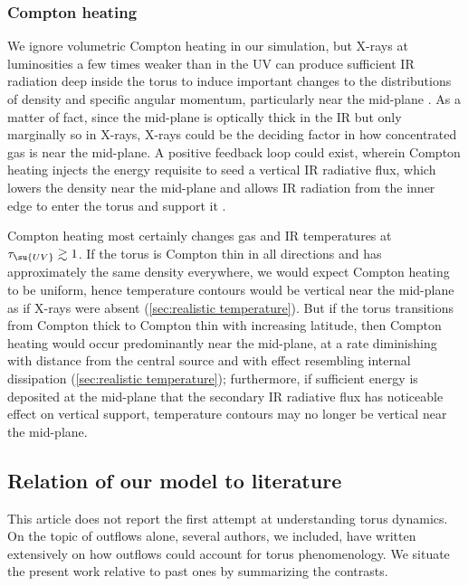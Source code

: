 \documentclass[twocolumn]{article}
\newcommand*\xray{\texorpdfstring{X\protect\nobreakdash-ray}{X-ray}}
\newcommand*\xrays{\xray s}
\begin{document}
\subsubsection{Compton heating}
\label{sec:Compton heating}

We ignore volumetric Compton heating in our simulation, but \xrays{} at
luminosities a few times weaker than in the \ac{UV} can produce sufficient
\ac{IR} radiation deep inside the torus to induce important changes to the
distributions of density and specific angular momentum, particularly near the
mid-plane \citep{2008ApJ...679.1018S}. As a matter of fact, since the mid-plane
is optically thick in the \ac{IR} but only marginally so in \xrays, \xrays{}
could be the deciding factor in how concentrated gas is near the mid-plane. A
positive feedback loop could exist, wherein Compton heating injects the energy
requisite to seed a vertical \ac{IR} radiative flux, which lowers the density
near the mid-plane and allows \ac{IR} radiation from the inner edge to enter
the torus and support it \citep[see also][]{2012ApJ...759...36R}.

Compton heating most certainly changes gas and \ac{IR} temperatures at
$\tau_\su{UV}\gtrsim1$. If the torus is Compton thin in all directions and has
approximately the same density everywhere, we would expect Compton heating to
be uniform, hence temperature contours would be vertical near the mid-plane as
if \xrays{} were absent (\cref{sec:realistic temperature}). But if the torus
transitions from Compton thick to Compton thin with increasing latitude, then
Compton heating would occur predominantly near the mid-plane, at a rate
diminishing with distance from the central source and with effect resembling
internal dissipation (\cref{sec:realistic temperature}); furthermore, if
sufficient energy is deposited at the mid-plane that the secondary \ac{IR}
radiative flux has noticeable effect on vertical support, temperature contours
may no longer be vertical near the mid-plane.

\subsection{Relation of our model to literature}
\label{sec:comparison}

This article does not report the first attempt at understanding torus dynamics.
On the topic of outflows alone, several authors, we included, have written
extensively on how outflows could account for torus phenomenology. We situate
the present work relative to past ones by summarizing the contrasts.
\end{document}
